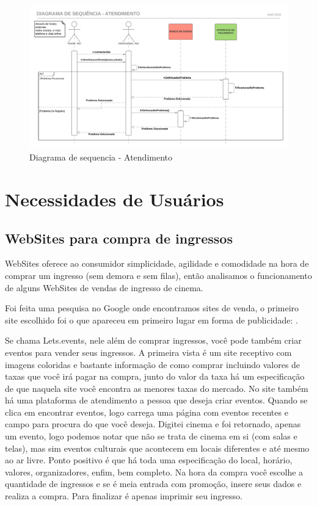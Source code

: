 \documentclass[12pt]{article}
\begin{document}
    \begin{figure}[h]
        \centering
        \includegraphics[scale=0.5]{./Imagens/DiagramasDeSequencia/DiagramaDeSequencia9.png}
        \caption{Diagrama de sequencia - Atendimento}
        \label{fig:DiagramaSequencia09}
    \end{figure}
    \FloatBarrier

\section{Necessidades de Usuários}
    \subsection{WebSites para compra de ingressos}
        WebSites oferece ao consumidor simplicidade, agilidade e comodidade na hora de comprar um ingresso (sem demora e sem filas), então analisamos o funcionamento de alguns WebSites de vendas de ingresso de cinema.

	    Foi feita uma pesquisa no Google onde encontramos sites de venda, o primeiro site escolhido foi o que apareceu em primeiro lugar em forma de publicidade: \cite{letsEvents}.
	
	    Se chama Lets.events, nele além de comprar ingressos, você pode também criar eventos para vender seus ingressos. A primeira vista é um site receptivo com imagens coloridas e bastante informação de como comprar incluindo valores de taxas que você irá pagar na compra, junto do valor da taxa há um especificação de que naquela site você encontra as menores taxas do mercado. 
        No site também há uma plataforma de atendimento a pessoa que deseja criar eventos.
        Quando se clica em encontrar eventos, logo carrega uma página com eventos recentes e campo para procura do que você deseja. Digitei cinema e foi retornado, apenas um evento, logo podemos notar que não se trata de cinema em si (com salas e telas), mas sim eventos culturais que acontecem em locais diferentes e até mesmo ao ar livre. 
        Ponto positivo é que há toda uma especificação do local, horário, valores, organizadores, enfim, bem completo. Na hora da compra você escolhe a quantidade de ingressos e se é meia entrada com promoção, insere seus dados e realiza a compra. Para finalizar é apenas imprimir seu ingresso.
\end{document}
